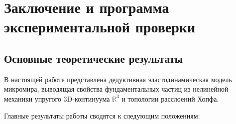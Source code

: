 \documentclass[12pt,a4paper]{article}
\begin{document}
\section{Заключение и программа экспериментальной проверки}

\subsection{Основные теоретические результаты}
В настоящей работе представлена дедуктивная эластодинамическая модель микромира, выводящая свойства фундаментальных частиц из нелинейной механики упругого 3D-континуума $\mathbb{R}^3$ и топологии расслоений Хопфа.

Главные результаты работы сводятся к следующим положениям:
\end{document}
